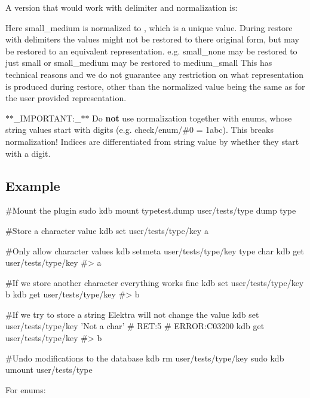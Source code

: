 A version that would work with delimiter and normalization is\+:




Here {\ttfamily small\+\_\+medium} is normalized to {}, which is a unique value. During restore with delimiters the values might not be restored to there original form, but may be restored to an equivalent representation. e.\+g. {\ttfamily small\+\_\+none} may be restored to just {\ttfamily small} or {\ttfamily small\+\_\+medium} may be restored to {\ttfamily medium\+\_\+small} This has technical reasons and we do not guarantee any restriction on what representation is produced during restore, other than the normalized value being the same as for the user provided representation.

$\ast$$\ast$\+\_\+\+I\+M\+P\+O\+R\+T\+A\+NT\+:\+\_\+$\ast$$\ast$ Do {\bfseries not} use normalization together with enums, whose string values start with digits (e.\+g. {\ttfamily check/enum/\#0 = 1abc}). This breaks normalization! Indices are differentiated from string value by whether they start with a digit.

\subsection*{Example}


\begin{DoxyCode}
#Mount the plugin
sudo kdb mount typetest.dump user/tests/type dump type

#Store a character value
kdb set user/tests/type/key a

#Only allow character values
kdb setmeta user/tests/type/key type char
kdb get user/tests/type/key
#> a

#If we store another character everything works fine
kdb set user/tests/type/key b
kdb get user/tests/type/key
#> b

#If we try to store a string Elektra will not change the value
kdb set user/tests/type/key 'Not a char'
# RET:5
# ERROR:C03200
kdb get user/tests/type/key
#> b

#Undo modifications to the database
kdb rm user/tests/type/key
sudo kdb umount user/tests/type
\end{DoxyCode}


For enums\+:


